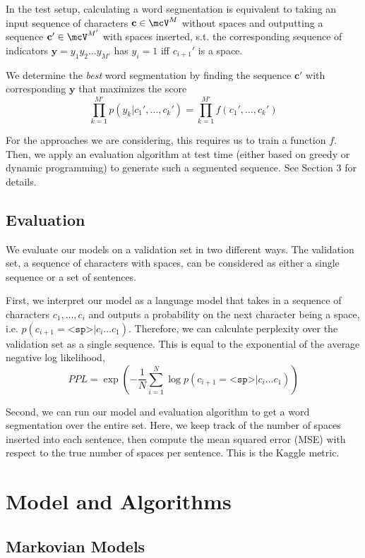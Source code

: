 \documentclass[11pt]{article}
\begin{document}
In the test setup, calculating a word segmentation is equivalent to taking an input sequence of characters $\mathbf{c} \in \mcV^M$ without spaces and outputting a sequence $\mathbf{c}' \in \mcV^{M'}$ with spaces inserted, s.t. the corresponding sequence of indicators $\mathbf{y} = y_1y_2 \ldots y_{M'}$ has $y_i = 1$ iff $c_{i+1}'$ is a space.

We determine the \emph{best} word segmentation by finding the sequence $\mathbf{c}'$ with corresponding $\mathbf{y}$ that maximizes the score
$$\prod_{k=1}^{M'} p(y_k | c_1', \ldots, c_k') = \prod_{k=1}^{M'} f(c_1', \ldots, c_k') $$

For the approaches we are considering, this requires us to train a function $f$. Then, we apply an evaluation algorithm at test time (either based on greedy or dynamic programming) to generate such a segmented sequence. See Section 3 for details.

\subsection{Evaluation}

We evaluate our models on a validation set in two different ways. The validation set, a sequence of characters with spaces, can be considered as either a single sequence or a set of sentences.

First, we interpret our model as a language model that takes in a sequence of characters $c_1, \ldots, c_i$ and outputs a probability on the next character being a space, i.e. $p(c_{i+1} = \texttt{<sp>} | c_i \ldots c_1)$. Therefore, we can calculate perplexity over the validation set as a single sequence. This is equal to the exponential of the average negative log likelihood,
$$PPL = \exp\left(-\frac{1}{N} \sum_{i=1}^N \log p(c_{i+1} = \texttt{<sp>} | c_i \ldots c_1)\right)$$

Second, we can run our model and evaluation algorithm to get a word segmentation over the entire set. Here, we keep track of the number of spaces inserted into each sentence, then compute the mean squared error (MSE) with respect to the true number of spaces per sentence. This is the Kaggle metric.

\section{Model and Algorithms}

\subsection{Markovian Models}
\end{document}
